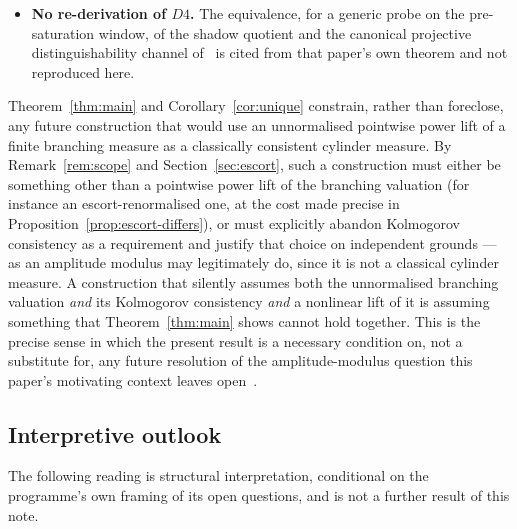 \documentclass[11pt,a4paper]{article}
\theoremstyle{definition}
\theoremstyle{remark}
\begin{document}
\begin{itemize}
  Section~\ref{sec:automaton} --- \textup{H2} supplies this paper's instance, but is not
  otherwise used: Proposition~\ref{prop:incomparable}'s quotient incomparability
  (Section~\ref{sec:quotients}), which uses only the group structure;
  Proposition~\ref{prop:conjugate}'s character identity; and
  Proposition~\ref{prop:relabel} and Corollary~\ref{cor:real}
  (Remark~\ref{rem:relabel-scope}). Theorem~\ref{thm:main}, Corollary~\ref{cor:unique},
  and Section~\ref{sec:escort} (Section~\ref{sec:main}) are unconditional, general, and
  independent of \textup{H2} and of this automaton entirely.
  \item \textbf{No re-derivation of $D4$.} The equivalence, for a generic probe on the
  pre-saturation window, of the shadow quotient and the canonical projective
  distinguishability channel of~\cite{Beau2026tb} is cited from that paper's own
  theorem and not reproduced here.
\end{itemize}

Theorem~\ref{thm:main} and Corollary~\ref{cor:unique} constrain, rather than foreclose,
any future construction that would use an unnormalised pointwise power lift of a
finite branching measure as a classically consistent cylinder measure. By
Remark~\ref{rem:scope} and Section~\ref{sec:escort}, such a construction must either be
something other than a pointwise power lift of the branching valuation (for instance an
escort-renormalised one, at the cost made precise in
Proposition~\ref{prop:escort-differs}), or must explicitly abandon Kolmogorov
consistency as a requirement and justify that choice on independent grounds --- as an
amplitude modulus may legitimately do, since it is not a classical cylinder measure. A
construction that silently assumes both the unnormalised branching valuation \emph{and}
its Kolmogorov consistency \emph{and} a nonlinear lift of it is assuming something that
Theorem~\ref{thm:main} shows cannot hold together. This is the precise sense in which
the present result is a necessary condition on, not a substitute for, any future
resolution of the amplitude-modulus question this paper's motivating context leaves
open~\cite{Beau2026steft}.

\subsection{Interpretive outlook}
\label{subsec:interp-outlook}

The following reading is structural interpretation, conditional on the programme's own
framing of its open questions, and is not a further result of this note.
\end{document}
